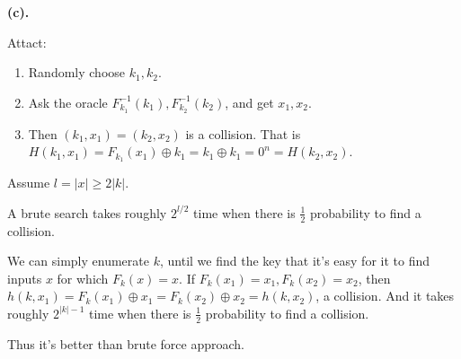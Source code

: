 \documentclass[a4paper]{article}
\newenvironment{problem}[2][Problem]{\begin{trivlist}
\item[\hskip \labelsep {\bfseries #1}\hskip \labelsep {\bfseries #2.}]}{\end{trivlist}}
\begin{document}
\begin{problem}{6.19}
\textbf{(c).}\par
Attact:\begin{enumerate}
    \item Randomly choose $k_1,k_2$.
    \item Ask the oracle $F_{k_1}^{-1}(k_1),F_{k_2}^{-1}(k_2)$, and get $x_1,x_2$.
    \item Then $(k_1,x_1)=(k_2,x_2)$ is a collision. That is $H(k_1,x_1)=F_{k_1}(x_1)\oplus k_1=k_1\oplus k_1=0^n=H(k_2,x_2)$.
\end{enumerate}
\end{problem}

\begin{problem}{6.21}
Assume $l=|x|\ge2|k|$.\par
A brute search takes roughly $2^{l/2}$ time when there is $\frac12$ probability to find a collision. \par
We can simply enumerate $k$, until we find the key that it's easy for it to find inputs $x$ for which $F_k(x)=x$. If $F_k(x_1)=x_1,F_k(x_2)=x_2$, then $h(k,x_1)=F_k(x_1)\oplus x_1=F_k(x_2)\oplus x_2=h(k,x_2)$, a collision. And it takes roughly $2^{|k|-1}$ time when there is $\frac12$ probability to find a collision. \par
Thus it's better than brute force approach.

\end{problem}
\end{document}

